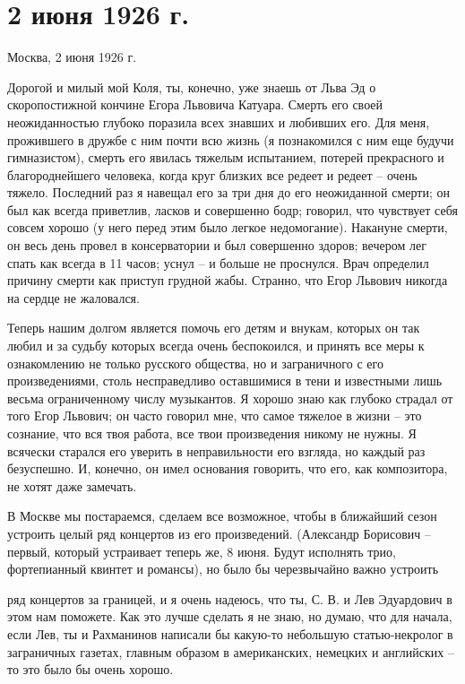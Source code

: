 \section{2 июня 1926 г.}


Москва, 2 июня 1926 г.

Дорогой и милый мой Коля, ты, конечно, уже знаешь от Льва Эд о
скоропостижной кончине Егора Львовича Катуара. Смерть его своей неожиданностью
глубоко поразила всех знавших и любивших его. Для меня, прожившего в дружбе с
ним почти всю жизнь (я познакомился с ним еще будучи гимназистом), смерть его
явилась тяжелым испытанием, потерей прекрасного и благороднейшего человека,
когда круг близких все редеет и редеет -- очень тяжело. Последний раз я навещал
его за три дня до его неожиданной смерти; он был как всегда приветлив, ласков и
совершенно бодр; говорил, что чувствует себя совсем хорошо (у него перед этим
было легкое недомогание). Накануне смерти, он весь день провел в консерватории
и был совершенно здоров; вечером лег спать как всегда в 11 часов; уснул -- и
больше не проснулся. Врач определил причину смерти как приступ грудной жабы.
Странно, что Егор Львович никогда на сердце не жаловался.


Теперь нашим долгом является помочь его детям и внукам, которых он так любил и
за судьбу которых всегда очень беспокоился, и принять все меры к ознакомлению
не только русского общества, но и заграничного с его произведениями, столь
несправедливо оставшимися в тени и известными лишь весьма ограниченному числу
музыкантов. Я хорошо знаю как глубоко страдал от того Егор Львович; он часто
говорил мне, что самое тяжелое в жизни -- это сознание, что вся твоя работа,
все твои произведения никому не нужны. Я всячески старался его уверить в
неправильности его взгляда, но каждый раз безуспешно. И, конечно, он имел
основания говорить, что его, как композитора, не хотят даже замечать.

В Москве мы постараемся, сделаем все возможное, чтобы в ближайший сезон
устроить целый ряд концертов из его произведений. (Александр Борисович --
первый, который устраивает теперь же, 8 июня. Будут исполнять трио,
фортепианный квинтет и романсы), но было бы черезвычайно важно устроить


\noindent ряд концертов за границей, и я очень надеюсь, что ты, С. В.
 и Лев Эдуардович  в этом нам поможете. Как это
лучше сделать я не знаю, но думаю, что для начала, если Лев, ты и Рахманинов
написали бы какую-то небольшую статью-некролог в заграничных газетах, главным
образом в американских, немецких и английских -- то это было бы очень хорошо.

